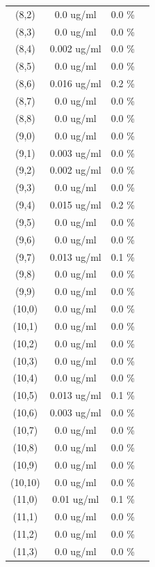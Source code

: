\documentclass{article}
\begin{document}
\begin{tabular}{c c c c}
(8,2)&        0.0 ug/ml        &0.0 \%\\
(8,3)&        0.0 ug/ml        &0.0 \%\\
(8,4)&        0.002 ug/ml        &0.0 \%\\
(8,5)&        0.0 ug/ml        &0.0 \%\\
(8,6)&        0.016 ug/ml        &0.2 \%\\
(8,7)&        0.0 ug/ml        &0.0 \%\\
(8,8)&        0.0 ug/ml        &0.0 \%\\
(9,0)&        0.0 ug/ml        &0.0 \%\\
(9,1)&        0.003 ug/ml        &0.0 \%\\
(9,2)&        0.002 ug/ml        &0.0 \%\\
(9,3)&        0.0 ug/ml        &0.0 \%\\
(9,4)&        0.015 ug/ml        &0.2 \%\\
(9,5)&        0.0 ug/ml        &0.0 \%\\
(9,6)&        0.0 ug/ml        &0.0 \%\\
(9,7)&        0.013 ug/ml        &0.1 \%\\
(9,8)&        0.0 ug/ml        &0.0 \%\\
(9,9)&        0.0 ug/ml        &0.0 \%\\
(10,0)&        0.0 ug/ml        &0.0 \%\\
(10,1)&        0.0 ug/ml        &0.0 \%\\
(10,2)&        0.0 ug/ml        &0.0 \%\\
(10,3)&        0.0 ug/ml        &0.0 \%\\
(10,4)&        0.0 ug/ml        &0.0 \%\\
(10,5)&        0.013 ug/ml        &0.1 \%\\
(10,6)&        0.003 ug/ml        &0.0 \%\\
(10,7)&        0.0 ug/ml        &0.0 \%\\
(10,8)&        0.0 ug/ml        &0.0 \%\\
(10,9)&        0.0 ug/ml        &0.0 \%\\
(10,10)&        0.0 ug/ml        &0.0 \%\\
(11,0)&        0.01 ug/ml        &0.1 \%\\
(11,1)&        0.0 ug/ml        &0.0 \%\\
(11,2)&        0.0 ug/ml        &0.0 \%\\
(11,3)&        0.0 ug/ml        &0.0 \%\\

\end{tabular}
\end{document}
